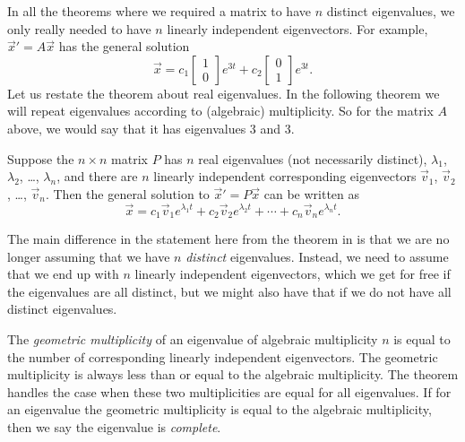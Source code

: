\documentclass{ximera}
\begin{document}
In all the theorems where we required a matrix to have $n$ distinct eigenvalues, we only really needed to have $n$ linearly independent eigenvectors.  For example, ${\vec{x}}' = A\vec{x}$ has the general solution
\begin{equation*}
    \vec{x} =  c_1 
    \begin{bmatrix} 
        1 \\ 
        0 
    \end{bmatrix} 
    e^{3t} + c_2 
    \begin{bmatrix} 
        0 \\ 
        1 
    \end{bmatrix} e^{3t} .
\end{equation*}
Let us restate the theorem about real eigenvalues.  In the following theorem we will repeat eigenvalues according to (algebraic) multiplicity.  So for the matrix $A$ above, we would say that it has eigenvalues 3 and 3.

\begin{theorem}{}
    Suppose the $n \times n$ matrix $P$  has $n$ real eigenvalues (not necessarily distinct), $\lambda_1$, $\lambda_2$, \ldots, $\lambda_n$, and there are $n$ linearly independent corresponding eigenvectors $\vec{v}_1$, $\vec{v}_2$, \ldots, $\vec{v}_n$.  Then the general solution to  ${\vec{x}}' = P\vec{x}$ can be written as
    \begin{equation*}
        \vec{x} = c_1 \vec{v}_1 e^{\lambda_1 t} + c_2 \vec{v}_2 e^{\lambda_2 t} + \cdots + c_n \vec{v}_n e^{\lambda_n t} .
    \end{equation*}
\end{theorem}
The main difference in the statement here from the theorem in  is that we are no longer assuming that we have $n$ \emph{distinct} eigenvalues. Instead, we need to assume that we end up with $n$ linearly independent eigenvectors, which we get for free if the eigenvalues are all distinct, but we might also have that if we do not have all distinct eigenvalues.

The \emph{geometric multiplicity} of an eigenvalue of algebraic multiplicity $n$ is equal to the number of corresponding linearly independent eigenvectors. The geometric multiplicity is always less than or equal to the algebraic multiplicity.  The theorem handles the case when these two multiplicities are equal for all eigenvalues. If for an eigenvalue the geometric multiplicity is equal to the algebraic multiplicity, then we say the eigenvalue is \emph{complete}.
\end{document}
